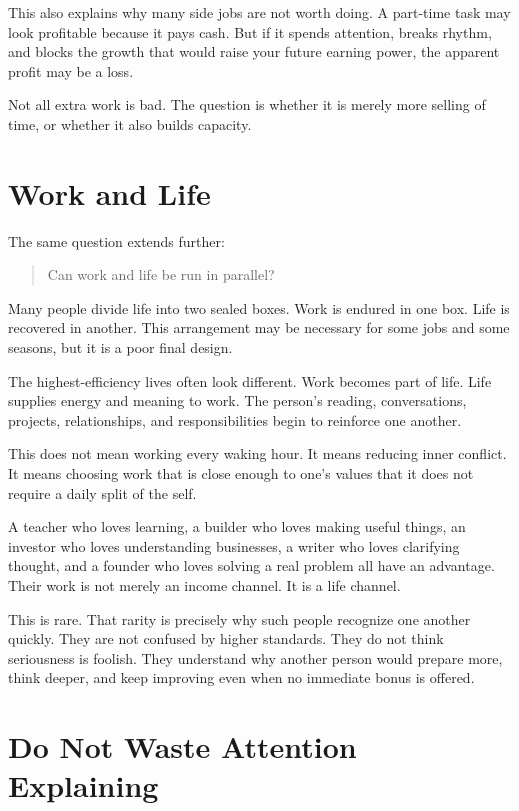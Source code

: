This also explains why many side jobs are not worth doing. A part-time task may look profitable because it pays cash. But if it spends attention, breaks rhythm, and blocks the growth that would raise your future earning power, the apparent profit may be a loss.

Not all extra work is bad. The question is whether it is merely more selling of time, or whether it also builds capacity.

\section*{Work and Life}

The same question extends further:

\begin{quote}
Can work and life be run in parallel?
\end{quote}

Many people divide life into two sealed boxes. Work is endured in one box. Life is recovered in another. This arrangement may be necessary for some jobs and some seasons, but it is a poor final design.

The highest-efficiency lives often look different. Work becomes part of life. Life supplies energy and meaning to work. The person's reading, conversations, projects, relationships, and responsibilities begin to reinforce one another.

This does not mean working every waking hour. It means reducing inner conflict. It means choosing work that is close enough to one's values that it does not require a daily split of the self.

A teacher who loves learning, a builder who loves making useful things, an investor who loves understanding businesses, a writer who loves clarifying thought, and a founder who loves solving a real problem all have an advantage. Their work is not merely an income channel. It is a life channel.

This is rare. That rarity is precisely why such people recognize one another quickly. They are not confused by higher standards. They do not think seriousness is foolish. They understand why another person would prepare more, think deeper, and keep improving even when no immediate bonus is offered.

\section*{Do Not Waste Attention Explaining}

